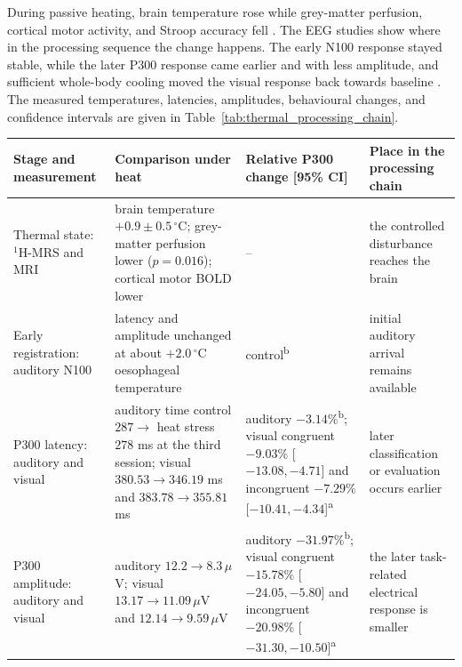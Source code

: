 During passive heating, brain temperature rose while grey-matter perfusion, cortical
motor activity, and Stroop accuracy fell \citep{tan2024heat}. The EEG studies show
where in the processing sequence the change happens. The early N100 response stayed
stable, while the later P300 response came earlier and with less amplitude, and
sufficient whole-body cooling moved the visual response back towards baseline
\citep{shibasaki2016heat,nakata2021heat}. The measured temperatures, latencies,
amplitudes, behavioural changes, and confidence intervals are given in
Table~\ref{tab:thermal_processing_chain}.

\begin{table}[t]
\centering
\footnotesize
\renewcommand{\arraystretch}{0.97}
\begin{tabular}{@{}
>{\raggedright\arraybackslash}p{2.8cm}
>{\raggedright\arraybackslash}p{3.35cm}
>{\raggedright\arraybackslash}p{3.9cm}
>{\raggedright\arraybackslash}p{3.2cm}@{}}
\toprule
Stage and measurement & Comparison under heat & Relative P300 change [95\% CI] & Place in the processing chain \\
\midrule
Thermal state: $^{1}$H-MRS and MRI
& brain temperature $+0.9\pm0.5\,{}^{\circ}$C; grey-matter perfusion lower ($p=0.016$); cortical motor BOLD lower
& --
& the controlled disturbance reaches the brain \citep{tan2024heat} \\[2pt]
Early registration: auditory N100
& latency and amplitude unchanged at about $+2.0\,{}^{\circ}$C oesophageal temperature
& control\textsuperscript{b}
& initial auditory arrival remains available \citep{shibasaki2016heat} \\[2pt]
P300 latency: auditory and visual
& auditory time control $287\rightarrow$ heat stress $278$ ms at the third session; visual $380.53\rightarrow346.19$ ms and $383.78\rightarrow355.81$ ms
& auditory $-3.14\%$\textsuperscript{b}; visual congruent $-9.03\%$ [$-13.08,-4.71$] and incongruent $-7.29\%$ [$-10.41,-4.34$]\textsuperscript{a}
& later classification or evaluation occurs earlier \citep{shibasaki2016heat,nakata2021heat} \\[2pt]
P300 amplitude: auditory and visual
& auditory $12.2\rightarrow8.3\,\mu$V; visual $13.17\rightarrow11.09\,\mu$V and $12.14\rightarrow9.59\,\mu$V
& auditory $-31.97\%$\textsuperscript{b}; visual congruent $-15.78\%$ [$-24.05,-5.80$] and incongruent $-20.98\%$ [$-31.30,-10.50$]\textsuperscript{a}
& the later task-related electrical response is smaller \citep{shibasaki2016heat,nakata2021heat} \\[2pt]

\end{tabular}
\end{table}
